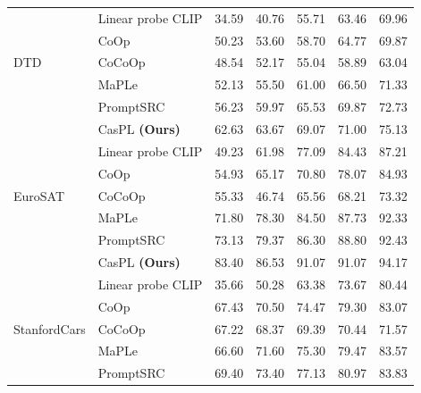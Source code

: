 \begin{table}[t!]
{\begin{tabular}{ll|ccccc}
                                       \hline
        \multirow{5}{*}{DTD}           & Linear probe CLIP       & 34.59	&40.76	&55.71	&63.46	&69.96\\
                                       & CoOp                   &50.23&	53.60	&58.70	&64.77	&69.87\\
                                       & CoCoOp                      & 48.54	&52.17	&55.04	&58.89	&63.04\\
                                       & MaPLe                  & 52.13	&55.50	&61.00&	66.50&	71.33\\
                                       &  PromptSRC                  & 56.23&59.97	&65.53	&69.87	&72.73\\
                                       \rowcolor{tablecolor}
                                        & CasPL \textbf{(Ours) }    &62.63  &63.67 &69.07 &71.00 	&75.13      \\
                                       \hline
        \multirow{5}{*}{EuroSAT}       & Linear probe CLIP       &49.23	&61.98	&77.09&	84.43	&87.21\\
                                       & CoOp                   &54.93	&65.17	&70.80	&78.07	&84.93\\
                                       & CoCoOp                  & 55.33	&46.74	&65.56&	68.21	&73.32\\
                                        & MaPLe                  & 71.80	&78.30	&84.50&	87.73&	92.33\\
                                       & PromptSRC              &73.13 &79.37	&86.30	&88.80	&92.43\\
                                       \rowcolor{tablecolor}
                                        & CasPL \textbf{(Ours) }   &83.40 &86.53 	&91.07 	&91.07 	&94.17     \\
        \hline
        \multirow{5}{*}{StanfordCars}  & Linear probe CLIP     & 35.66	&50.28	&63.38	&73.67	&80.44\\
                                   & CoOp                        &67.43	&70.50	&74.47	&79.30	&83.07\\
                                           & CoCoOp              & 67.22	&68.37	&69.39	&70.44&	71.57\\
                                         & MaPLe                  & 66.60	&71.60	&75.30&	79.47&	83.57\\
                                      &  PromptSRC               &69.40	&73.40	&77.13	&80.97	&83.83\\

\end{tabular}}
\end{table}
